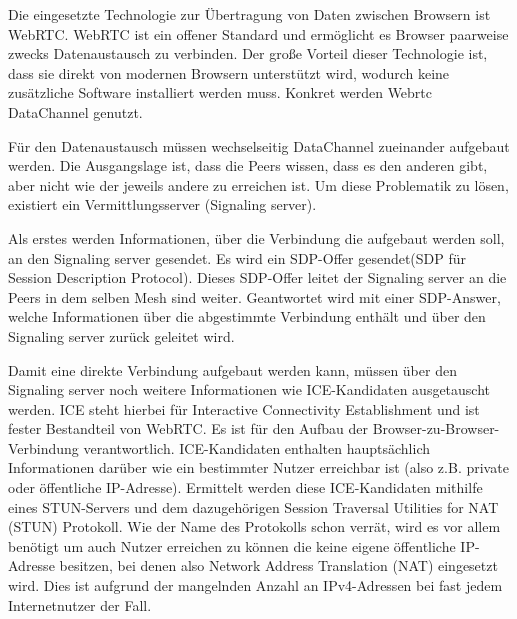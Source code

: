 Die eingesetzte Technologie zur Übertragung von Daten zwischen Browsern ist WebRTC. WebRTC ist ein offener Standard und ermöglicht es Browser paarweise zwecks Datenaustausch zu verbinden. Der große Vorteil dieser Technologie ist, dass sie direkt von modernen Browsern unterstützt wird, wodurch keine zusätzliche Software installiert werden muss. Konkret werden Webrtc DataChannel genutzt.

Für den Datenaustausch müssen wechselseitig DataChannel zueinander aufgebaut werden. Die Ausgangslage ist, dass die Peers wissen, dass es den anderen gibt, aber nicht wie der jeweils andere zu erreichen ist. Um diese Problematik zu lösen, existiert ein Vermittlungsserver (Signaling server).

Als erstes werden Informationen, über die Verbindung die aufgebaut werden soll, an den Signaling server gesendet. Es wird ein SDP-Offer gesendet(SDP für Session Description Protocol). Dieses SDP-Offer leitet der Signaling server an die Peers in dem selben Mesh sind weiter. Geantwortet wird mit einer SDP-Answer, welche Informationen über die abgestimmte Verbindung enthält und über den Signaling server zurück geleitet wird.

Damit eine direkte Verbindung aufgebaut werden kann, müssen über den Signaling server noch weitere Informationen wie ICE-Kandidaten ausgetauscht werden. ICE steht hierbei für Interactive Connectivity Establishment und ist fester Bestandteil von WebRTC. Es ist für den Aufbau der Browser-zu-Browser-Verbindung verantwortlich. ICE-Kandidaten enthalten hauptsächlich Informationen darüber wie ein bestimmter Nutzer erreichbar ist (also z.B. private oder öffentliche IP-Adresse). Ermittelt werden diese ICE-Kandidaten mithilfe eines STUN-Servers und dem dazugehörigen Session Traversal Utilities for NAT (STUN) Protokoll. Wie der Name des Protokolls schon verrät, wird es vor allem benötigt um auch Nutzer erreichen zu können die keine eigene öffentliche IP-Adresse besitzen, bei denen also Network Address Translation (NAT) eingesetzt wird. Dies ist aufgrund der mangelnden Anzahl an IPv4-Adressen bei fast jedem Internetnutzer der Fall.

